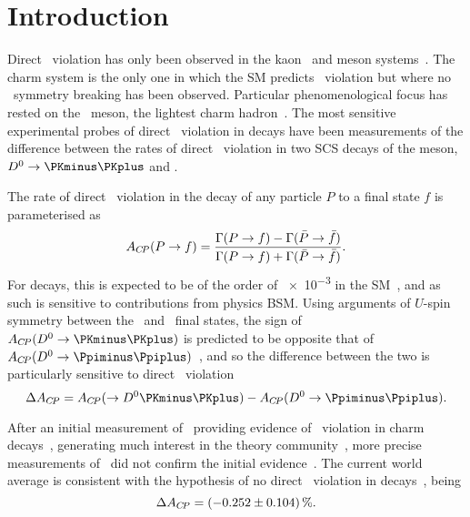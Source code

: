 \chapter{Introduction}
\label{chap:cpv:introduction}

Direct \CP\ violation has only been observed in the 
kaon~\cite{Christenson:1964fg,Batley:2002gn} and \PB meson 
systems~\cite{Aubert:2001nu,Abe:2001xe,Aaij:2012kz,Aaij:2013iua}.
The charm system is the only one in which the \ac{SM} predicts \CP\ violation 
but where no \CP\ symmetry breaking has been observed.
Particular phenomenological focus has rested on the \PDzero\ meson, the 
lightest charm hadron~\cite{Grossman:2006jg}.
The most sensitive experimental probes of direct \CP\ violation in \PDzero 
decays have been measurements of the difference between the rates of direct 
\CP\ violation in two \ac{SCS} decays of the \PDzero meson, 
$\decay{\PDzero}{\KmKp}$ and \pimpip.

The rate of direct \CP\ violation in the decay of any particle $P$ to a final 
state $f$ is parameterised as
\begin{equation}
  \ACP(\decay{P}{f}) = \frac{%
    \Gamma(\decay{P}{f}) - \Gamma(\decay{\bar{P}}{\bar{f}})
  }{%
    \Gamma(\decay{P}{f}) + \Gamma(\decay{\bar{P}}{\bar{f}})
  }.
  \label{eqn:cpv:introduction:acp}
\end{equation}
For \decay{\PDzero}{\hmhp} decays, this is expected to be of the order of 
\num{e-3} in the \ac{SM}~\cite{Grossman:2006jg}, and as such is sensitive to 
contributions from physics \acl{BSM}.
Using arguments of $U$-spin symmetry between the \KmKp\ and \pimpip\ final 
states, the sign of $\ACP(\decay{\PDzero}{\KmKp})$ is predicted to be opposite 
that of $\ACP(\decay{\PDzero}{\pimpip})$~\cite{Grossman:2006jg}, and so the 
difference between the two is particularly sensitive to direct \CP\ violation
\begin{equation}
  \dACP = \ACP\decay({\PDzero}{\KmKp}) - \ACP(\decay{\PDzero}{\pimpip}).
  \label{eqn:cpv:introduction:dacp_pure}
\end{equation}

After an initial measurement of \dACP\ providing evidence of \CP\ violation in 
charm decays~\cite{Aaij:2011in,Lenz:2013pwa}, generating much interest in the 
theory community~\cite{Lenz:2013pwa}, more precise measurements of \dACP\ did 
not confirm the initial evidence~\cite{Aaij:2014gsa,Aaij:2016cfh}.
The current world average is consistent with the hypothesis of no direct \CP\ 
violation in \PDzero decays~\cite{Amhis:2014hma}, being\footnotemark
\begin{equation}
  \dACP = \SI{-0.252 \pm 0.104}{\percent}.
  \label{eqn:cpv:introduction:dacp_world_average}
\end{equation}

